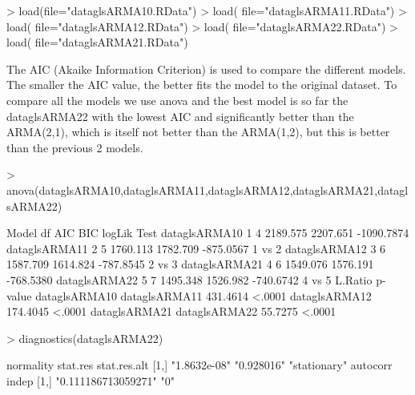 \documentclass[11pt, a4paper]{article} %
\begin{document}
\begin{Schunk}
\begin{Sinput}
> load(file="dataglsARMA10.RData")
> load( file="dataglsARMA11.RData")
> load( file="dataglsARMA12.RData")
> load( file="dataglsARMA22.RData")
> load( file="dataglsARMA21.RData")
\end{Sinput}
\end{Schunk}

The AIC (Akaike Information Criterion) is used to compare the different models. The smaller the AIC value, the better fits the model to the original dataset.  
To compare all the models we use anova and the best model is so far the dataglsARMA22 with the lowest AIC and significantly better than the ARMA(2,1), which is itself not better than the ARMA(1,2), but this is better than the previous 2 models. 

\begin{Schunk}
\begin{Sinput}
> anova(dataglsARMA10,dataglsARMA11,dataglsARMA12,dataglsARMA21,dataglsARMA22)
\end{Sinput}
\begin{Soutput}
              Model df      AIC      BIC     logLik   Test
dataglsARMA10     1  4 2189.575 2207.651 -1090.7874       
dataglsARMA11     2  5 1760.113 1782.709  -875.0567 1 vs 2
dataglsARMA12     3  6 1587.709 1614.824  -787.8545 2 vs 3
dataglsARMA21     4  6 1549.076 1576.191  -768.5380       
dataglsARMA22     5  7 1495.348 1526.982  -740.6742 4 vs 5
               L.Ratio p-value
dataglsARMA10                 
dataglsARMA11 431.4614  <.0001
dataglsARMA12 174.4045  <.0001
dataglsARMA21                 
dataglsARMA22  55.7275  <.0001
\end{Soutput}
\end{Schunk}

\begin{Schunk}
\begin{Sinput}
> diagnostics(dataglsARMA22)
\end{Sinput}
\begin{Soutput}
     normality    stat.res   stat.res.alt
[1,] "1.8632e-08" "0.928016" "stationary"
     autocorr            indep
[1,] "0.111186713059271" "0"  
\end{Soutput}
\end{Schunk}
\end{document}
